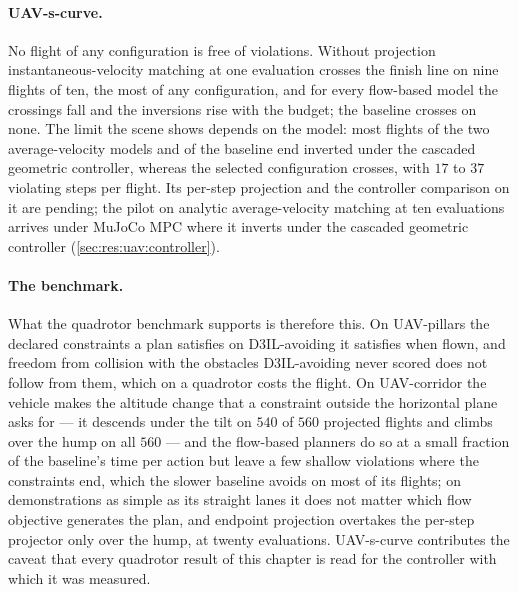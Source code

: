 \paragraph{UAV-s-curve.} No flight of any configuration is free of violations. Without projection
instantaneous-velocity matching at one evaluation crosses the finish line on nine flights of ten, the most
of any configuration, and for every flow-based model the crossings fall and the inversions rise with the
budget; the baseline crosses on none. The limit the scene shows depends on the model: most flights of the
two average-velocity models and of the baseline end inverted under the cascaded geometric controller,
whereas the selected configuration crosses, with $17$ to $37$ violating steps per flight. Its per-step projection and the
controller comparison on it are pending; the pilot on analytic average-velocity matching at ten evaluations
arrives under MuJoCo MPC where it inverts under the cascaded geometric controller
(\autoref{sec:res:uav:controller}).

\paragraph{The benchmark.} What the quadrotor benchmark supports is therefore this. On UAV-pillars the
declared constraints a plan satisfies on D3IL-avoiding it satisfies when flown, and freedom from collision
with the obstacles D3IL-avoiding never scored does not follow from them, which on a quadrotor costs the
flight. On UAV-corridor the vehicle makes the altitude change that a constraint outside the horizontal plane
asks for --- it descends under the tilt on $540$ of $560$ projected flights and climbs over the hump on all
$560$ --- and the flow-based planners do so at a small fraction of the baseline's time per action but leave a
few shallow violations where the constraints end, which the slower baseline avoids on most of its flights;
on demonstrations as simple as its straight lanes it does not matter which flow objective generates the
plan, and endpoint projection overtakes the per-step projector only over the hump, at twenty evaluations.
UAV-s-curve contributes the caveat that every quadrotor result of this chapter is read for the controller
with which it was measured.


